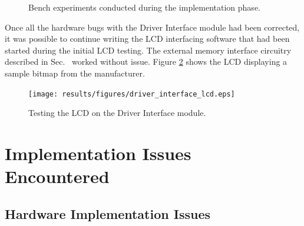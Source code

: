 \begin{figure}[h!]
\centering
{}
\caption{Bench experiments conducted during the implementation phase.}
\label{fig:bench_experiments}
\end{figure}

Once all the hardware bugs with the Driver Interface module had been corrected, it was possible to continue writing the LCD interfacing software that had been started during the initial LCD testing. The external memory interface circuitry described in Sec.\ \label{sec:lcd_module_data_interface} worked without issue. Figure \ref{fig:driver_interface_lcd} shows the LCD displaying a sample bitmap from the manufacturer.

\begin{figure}[h]
 \centering
 \texttt{[image: results/figures/driver\_interface\_lcd.eps]}
 \caption{Testing the LCD on the Driver Interface module.}
 \label{fig:driver_interface_lcd}
\end{figure}

\section{Implementation Issues Encountered}


\subsection{Hardware Implementation Issues}


